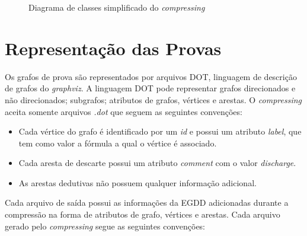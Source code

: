 \begin{figure}[ht]
  \begin{center}
    \caption{Diagrama de classes simplificado do \textit{compressing}}
    \label{fig:diag_comp}
  \end{center}
\end{figure}

\section{Representação das Provas}

Os grafos de prova são representados por arquivos DOT, linguagem de descrição de grafos do \textit{graphviz}. A linguagem DOT pode representar grafos direcionados e não direcionados; subgrafos; atributos de grafos, vértices e arestas. O \textit{compressing} aceita somente arquivos \textit{.dot} que seguem as seguintes convenções:

\begin{itemize}
    \item Cada vértice do grafo é identificado por um \textit{id} e possui um atributo \textit{label}, que tem como valor a fórmula a qual o vértice é associado.
    \item Cada aresta de descarte possui um atributo \textit{comment} com o valor \textit{discharge}.
    \item As arestas dedutivas não possuem qualquer informação adicional.
\end{itemize}

Cada arquivo de saída possui as informações da EGDD adicionadas durante a compressão na forma de atributos de grafo, vértices e arestas. Cada arquivo gerado pelo \textit{compressing} segue as seguintes convenções:

